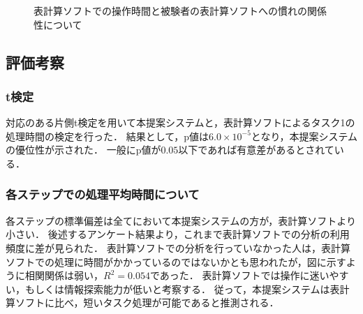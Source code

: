 \documentclass[sotsuron]{kuee}
\begin{document}
			\begin{figure}
				\begin{center}
				\end{center}
				\caption{表計算ソフトでの操作時間と被験者の表計算ソフトへの慣れの関係性について}
		  		\label{fig:result05}
			\end{figure}
		\subsection{評価考察}
			\subsubsection{t検定}
				対応のある片側t検定を用いて本提案システムと，表計算ソフトによるタスク1の処理時間の検定を行った．
				結果として，p値は$6.0 \times 10^{-5}$となり，本提案システムの優位性が示された．
				一般にp値が$0.05$以下であれば有意差があるとされている．
			\subsubsection{各ステップでの処理平均時間について}
				各ステップの標準偏差は全てにおいて本提案システムの方が，表計算ソフトより小さい．
				後述するアンケート結果より，これまで表計算ソフトでの分析の利用頻度に差が見られた．
				表計算ソフトでの分析を行っていなかった人は，表計算ソフトでの処理に時間がかかっているのではないかとも思われたが，図に示すように相関関係は弱い，$R^2 = 0.054$であった．
				表計算ソフトでは操作に迷いやすい，もしくは情報探索能力が低いと考察する．
				従って，本提案システムは表計算ソフトに比べ，短いタスク処理が可能であると推測される．
\end{document}
